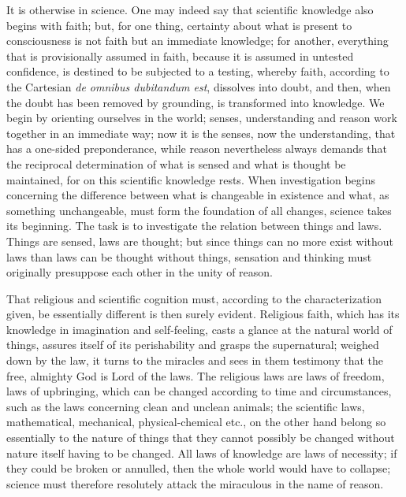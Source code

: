 \documentclass[12pt,a4paper]{article}
\newcommand{\opage}[1]{\marginnote{\footnotesize\textit{[#1]}}}
\begin{document}
\opage{6} It is otherwise in science. One may indeed say that scientific
knowledge also begins with faith; but, for one thing, certainty about
what is present to consciousness is not faith but an immediate
knowledge; for another, everything that is provisionally assumed in
faith, because it is assumed in untested confidence, is destined to be
subjected to a testing, whereby faith, according to the Cartesian
\textit{de omnibus dubitandum est}, dissolves into doubt, and then,
when the doubt has been removed by grounding, is transformed into
knowledge. We begin by orienting ourselves in the world; senses,
understanding and reason work together in an immediate way; now it is
the senses, now the understanding, that has a one-sided preponderance,
while reason nevertheless always demands that the reciprocal
determination of what is sensed and what is thought be maintained, for
on this scientific knowledge rests. When investigation begins
concerning the difference between what is changeable in existence and
what, as something unchangeable, must form the foundation of all
changes, science takes its beginning. The task is to investigate the
relation between things and laws. Things are sensed, laws are thought;
but since things can no more exist without laws than laws can be
thought without things, sensation and thinking must originally
presuppose each other in the unity of reason.

That religious and scientific cognition must, according to the
characterization given, be essentially different is then surely
evident. Religious faith, which has its knowledge in imagination and
self-feeling, casts a glance at the natural world of things, assures
itself of its perishability and grasps the supernatural; weighed down
by the law, it turns to the miracles and sees in them testimony that
the free, almighty God is Lord of the laws. The religious laws are laws
of freedom, laws of upbringing, which can be changed according to time
and circumstances, such as the laws concerning clean and unclean
animals; the scientific laws, mathematical, mechanical,
physical-chemical etc., on the other hand belong so essentially to the
nature of things that they cannot possibly be changed without nature
itself having to be changed. All laws of knowledge are laws of
necessity; if they could be broken or annulled, then \opage{7} the
whole world would have to collapse; science must therefore resolutely
attack the miraculous in the name of reason.
\end{document}
